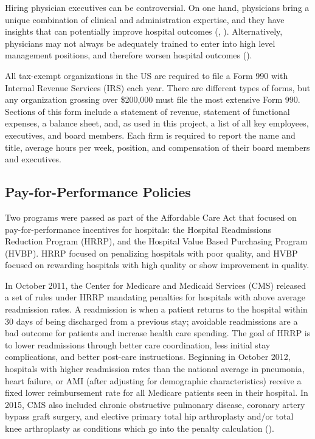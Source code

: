 \documentclass[12pt]{article}
\begin{document}
    Hiring physician executives can be controversial. On one hand, physicians bring a unique combination of clinical and administration expertise, and they have insights that can potentially improve hospital outcomes (\cite{Stajduhar_2023}, \cite{Ahmed_2022}). Alternatively, physicians may not always be adequately trained to enter into high level management positions, and therefore worsen hospital outcomes (\cite{HarvardBusinessReview2018}). 

    All tax-exempt organizations in the US are required to file a Form 990 with Internal Revenue Services (IRS) each year. There are different types of forms, but any organization grossing over \$200,000 must file the most extensive Form 990. Sections of this form include a statement of revenue, statement of functional expenses, a balance sheet, and, as used in this project, a list of all key employees, executives, and board members. Each firm is required to report the name and title, average hours per week, position, and compensation of their board members and executives. 

  
    \subsection{Pay-for-Performance Policies}\label{sec:hrrp}

    Two programs were passed as part of the Affordable Care Act that focused on pay-for-performance incentives for hospitals: the Hospital Readmissions Reduction Program (HRRP), and the Hospital Value Based Purchasing Program (HVBP). HRRP focused on penalizing hospitals with poor quality, and HVBP focused on rewarding hospitals with high quality or show improvement in quality. 

    In October 2011, the Center for Medicare and Medicaid Services (CMS) released a set of rules under HRRP mandating penalties for hospitals with above average readmission rates. A readmission is when a patient returns to the hospital within 30 days of being discharged from a previous stay; avoidable readmissions are a bad outcome for patients and increase health care spending. The goal of HRRP is to lower readmissions through better care coordination, less initial stay complications, and better post-care instructions. Beginning in October 2012, hospitals with higher readmission rates than the national average in pneumonia, heart failure, or AMI (after adjusting for demographic characteristics) receive a fixed lower reimbursement rate for all Medicare patients seen in their hospital. In 2015, CMS also included chronic obstructive pulmonary disease, coronary artery bypass graft surgery, and elective primary total hip arthroplasty and/or total knee arthroplasty as conditions which go into the penalty calculation (\cite{CMS}). 
    
\end{document}
